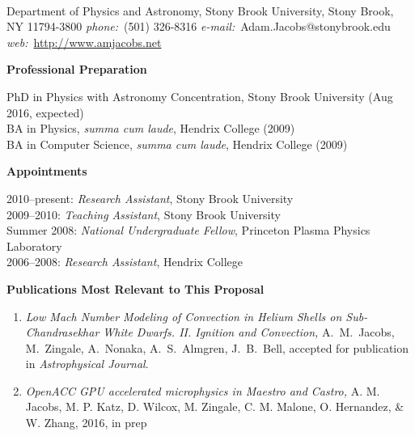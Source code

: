 \documentclass[11pt,letterpaper,english]{article}
\begin{document}
\setlength{\parindent}{0in} %

\pagestyle{fancy}   \renewcommand{%
\headrulewidth}{0.0pt}


\thispagestyle{plain}

\\
{Department of Physics and Astronomy, Stony Brook University, Stony Brook, NY 11794-3800} \smallskip
{{\it phone:}~(501) 326-8316 \hskip 2mm
{\it e-mail:}~Adam.Jacobs@stonybrook.edu \hskip 2mm \\[-0.25em]
{\it web:}~\url{http://www.amjacobs.net}}

\begin{flushleft} {\bf Professional Preparation}
{\parindent 16pt

PhD in Physics with Astronomy Concentration, Stony Brook University (Aug 2016, expected)\\ 
BA in Physics, \emph{summa cum laude}, Hendrix College (2009)\\ 
BA in Computer Science, \emph{summa cum laude}, Hendrix College (2009)\\ 
}

\vspace{.04in}
{\bf Appointments}
{\parindent 16pt

2010--present: {\em Research Assistant}, Stony Brook University \\ 
2009--2010: {\em Teaching Assistant}, Stony Brook University \\ 
Summer 2008:  {\em National Undergraduate Fellow}, Princeton Plasma Physics Laboratory \\ 
2006--2008: {\em Research Assistant}, Hendrix College \\
}

\vspace{.04in}
{\bf Publications Most Relevant to This Proposal}
\vspace{-6pt}
\begin{enumerate} \itemsep1pt \parskip0pt 
\item {\it Low Mach Number Modeling of Convection in Helium Shells on
      Sub-Chandrasekhar White Dwarfs. II. Ignition and Convection,} A.~M.~Jacobs,
      M.~Zingale, A.~Nonaka, A.~S.~Almgren, J.~B.~Bell, accepted for publication
      in {\it Astrophysical Journal}.

\item {\it OpenACC GPU accelerated microphysics in Maestro and Castro,} A. M. Jacobs, M. P. Katz,
   D. Wilcox, M. Zingale, C. M. Malone, O. Hernandez, & W. Zhang, 2016, in prep


\end{enumerate}
\end{flushleft}
\end{document}
